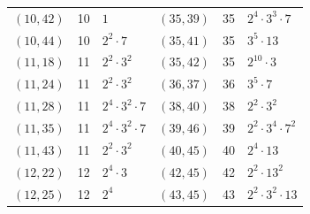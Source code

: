 \documentclass[11pt]{article}
\begin{document}
\begin{longtable}{@{}lrl@{\qquad}lrl@{}}
$(10,42)$ & 10 & $1$ & $(35,39)$ & 35 & $2^{4}\cdot 3^{3}\cdot 7$\\
$(10,44)$ & 10 & $2^{2}\cdot 7$ & $(35,41)$ & 35 & $3^{5}\cdot 13$\\
$(11,18)$ & 11 & $2^{2}\cdot 3^{2}$ & $(35,42)$ & 35 & $2^{10}\cdot 3$\\
$(11,24)$ & 11 & $2^{2}\cdot 3^{2}$ & $(36,37)$ & 36 & $3^{5}\cdot 7$\\
$(11,28)$ & 11 & $2^{4}\cdot 3^{2}\cdot 7$ & $(38,40)$ & 38 & $2^{2}\cdot 3^{2}$\\
$(11,35)$ & 11 & $2^{4}\cdot 3^{2}\cdot 7$ & $(39,46)$ & 39 & $2^{2}\cdot 3^{4}\cdot 7^{2}$\\
$(11,43)$ & 11 & $2^{2}\cdot 3^{2}$ & $(40,45)$ & 40 & $2^{4}\cdot 13$\\
$(12,22)$ & 12 & $2^{4}\cdot 3$ & $(42,45)$ & 42 & $2^{2}\cdot 13^{2}$\\
$(12,25)$ & 12 & $2^{4}$ & $(43,45)$ & 43 & $2^{2}\cdot 3^{2}\cdot 13$\\
\end{longtable}
\endgroup
\end{document}
